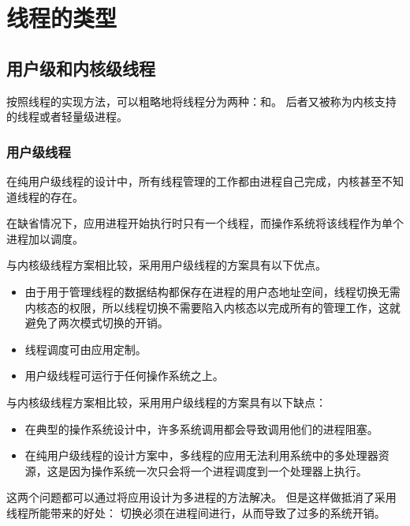 
\section{线程的类型}
{
    \subsection{用户级和内核级线程}
    {
        按照线程的实现方法，可以粗略地将线程分为两种：和。
        后者又被称为内核支持的线程或者轻量级进程。

        \subsubsection{用户级线程}
        {
            在纯用户级线程的设计中，所有线程管理的工作都由进程自己完成，内核甚至不知道线程的存在。

            在缺省情况下，应用进程开始执行时只有一个线程，而操作系统将该线程作为单个进程加以调度。

            与内核级线程方案相比较，采用用户级线程的方案具有以下优点。

            \begin{itemize}
                \item 由于用于管理线程的数据结构都保存在进程的用户态地址空间，线程切换无需内核态的权限，所以线程切换不需要陷入内核态以完成所有的管理工作，这就避免了两次模式切换的开销。
                \item 线程调度可由应用定制。
                \item 用户级线程可运行于任何操作系统之上。
            \end{itemize}

            与内核级线程方案相比较，采用用户级线程的方案具有以下缺点：

            \begin{itemize}
                \item 在典型的操作系统设计中，许多系统调用都会导致调用他们的进程阻塞。
                \item 在纯用户级线程的设计方案中，多线程的应用无法利用系统中的多处理器资源，这是因为操作系统一次只会将一个进程调度到一个处理器上执行。
            \end{itemize}

            这两个问题都可以通过将应用设计为多进程的方法解决。
            但是这样做抵消了采用线程所能带来的好处：
            切换必须在进程间进行，从而导致了过多的系统开销。

}}}
